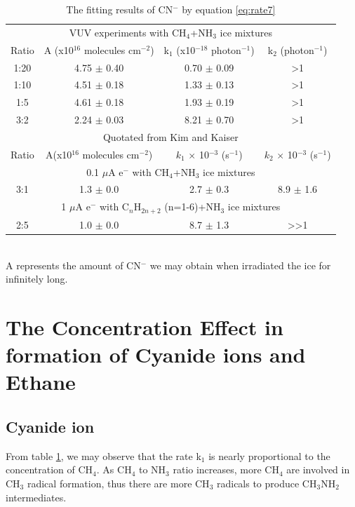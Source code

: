 \begin{table}[htbp]
\caption{The fitting results of CN$^-$ by equation \ref{eq:rate7}}
\label{tab:CNrate}
\begin{tabular}{cccc}
\hline
\hline
\multicolumn{4}{c}{VUV experiments with CH$_4$+NH$_3$ ice mixtures}\\
Ratio & A (x10$^{16}$ molecules cm$^{-2}$) & k$_1$ (x10$^{-18}$ photon$^{-1}$) & k$_2$ (photon$^{-1}$)\\
\hline
1:20 & 4.75 $\pm$ 0.40 & 0.70 $\pm$ 0.09 & >1 \\
1:10 & 4.51 $\pm$ 0.18 & 1.33 $\pm$ 0.13 & >1 \\
1:5 & 4.61 $\pm$ 0.18 & 1.93 $\pm$ 0.19 & >1 \\
3:2 & 2.24 $\pm$ 0.03 & 8.21 $\pm$ 0.70 & >1 \\
\hline
\hline
\multicolumn{4}{c}{Quotated from Kim and Kaiser\cite{kim}} \\
Ratio & A(x10$^{16}$ molecules cm$^{-2}$) & $k_1$ $\times$ 10$^{-3}$ (s$^{-1}$) &  $k_2$  $\times$ 10$^{-3}$ (s$^{-1}$)\\
\hline
\multicolumn{4}{c}{0.1 $\mu$A e$^-$ with CH$_4$+NH$_3$ ice mixtures}\\
3:1 & 1.3 $\pm$ 0.0 & 2.7 $\pm$ 0.3 & 8.9 $\pm$ 1.6 \\
\hline
\multicolumn{4}{c}{1 $\mu$A e$^-$ with C$_n$H$_{2n+2}$ (n=1-6)+NH$_3$ ice mixtures}\\
2:5 & 1.0 $\pm$ 0.0 & 8.7 $\pm$ 1.3 & >>1 \\
\hline
\end{tabular}\\
A represents the amount of CN$^-$ we may obtain when irradiated the ice for infinitely long.\
\end{table}

\section{The Concentration Effect in formation of Cyanide ions and Ethane}

\subsection{Cyanide ion}

From table \ref{tab:CNrate}, we may observe that the rate k$_1$ is nearly proportional to the concentration of CH$_4$.  As CH$_4$ to NH$_3$ ratio increases, more CH$_4$ are involved in CH$_3$ radical formation, thus there are more CH$_3$ radicals to produce CH$_3$NH$_2$ intermediates.

